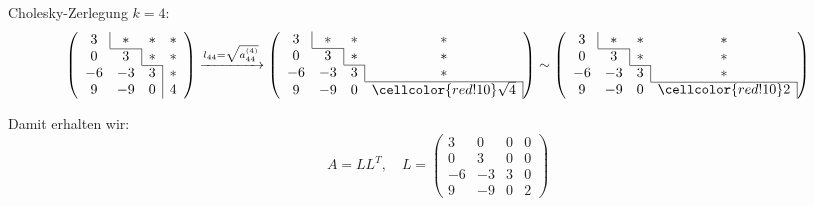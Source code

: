 \begin{example}{Cholesky-Zerlegung}
    \vspace{1em}
    $k = 4:$
    \[
        \left(
        \begin{array}{cccc}
                \multicolumn{1}{c|}{3} & *                      & *                      & * \\\cline{2-2}
                0                      & \multicolumn{1}{c|}{3} & *                      & * \\\cline{3-3}
                -6                     & -3                     & \multicolumn{1}{c|}{3} & * \\
                9                      & -9                     & \multicolumn{1}{c|}{0} & 4
            \end{array}
        \right)
        \xrightarrow{l_{44} = \sqrt{a^{(4)}_{44}}}
        \left(
        \begin{array}{cccc}
                \multicolumn{1}{c|}{3} & *                      & *                      & *                                                \\\cline{2-2}
                0                      & \multicolumn{1}{c|}{3} & *                      & *                                                \\\cline{3-3}
                -6                     & -3                     & \multicolumn{1}{c|}{3} & *                                                \\\cline{4-4}
                9                      & -9                     & 0                      & \multicolumn{1}{c|}{\cellcolor{red!10} \sqrt{4}}
            \end{array}
        \right)
        \sim
        \left(
        \begin{array}{cccc}
                \multicolumn{1}{c|}{3} & *                      & *                      & *                                         \\\cline{2-2}
                0                      & \multicolumn{1}{c|}{3} & *                      & *                                         \\\cline{3-3}
                -6                     & -3                     & \multicolumn{1}{c|}{3} & *                                         \\\cline{4-4}
                9                      & -9                     & 0                      & \multicolumn{1}{c|}{\cellcolor{red!10} 2}
            \end{array}
        \right)
    \]

    Damit erhalten wir:
    \[
        A = LL^T, \quad L =
        \begin{pmatrix}
            3  & 0  & 0 & 0 \\
            0  & 3  & 0 & 0 \\
            -6 & -3 & 3 & 0 \\
            9  & -9 & 0 & 2
        \end{pmatrix}
    \]
\end{example}